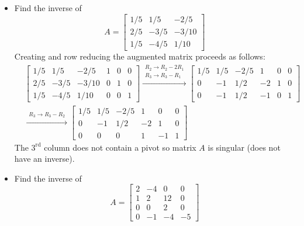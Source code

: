 \documentclass{article}
\begin{document}
\begin{itemize}
\begin{align*}
\begin{array}{ccc|ccc}
0 & 0 & 0 & -2 & 1 & 1  
\end{array}\right]
\end{align*}
The \(3^{\text{rd}}\) column does not contain a pivot so matrix \(A\) is singular (does not have an inverse).
\item Find the inverse of 
\[A = \begin{bmatrix}
1/5 & 1/5 & -2/5 \\
2/5 & -3/5 & -3/10 \\
1/5 & -4/5 & 1/10 
\end{bmatrix}\]
Creating and row reducing the augmented matrix proceeds as follows:
\begin{align*}
& \left[\begin{array}{ccc|ccc}
1/5 & 1/5 & -2/5     & 1 & 0 & 0 \\   
2/5 & -3/5 & -3/10 & 0 & 1 & 0 \\ 
1/5 & -4/5 & 1/10  & 0 & 0 & 1  
\end{array}\right]
\xrightarrow{\begin{array}{c} R_2 \rightarrow R_2 - 2R_1 \\ R_3 \rightarrow R_3 - R_1 \end{array}} 
\left[\begin{array}{ccc|ccc}
1/5 & 1/5 & -2/5 &  1 & 0 & 0 \\   
0    &   -1 & 1/2  & -2 & 1 & 0 \\ 
0    &   -1 & 1/2  & -1 & 0 & 1  
\end{array}\right] \\
& \xrightarrow{\begin{array}{c} R_3 \rightarrow R_3 - R_2 \end{array}} 
\left[\begin{array}{ccc|ccc}
1/5 & 1/5 & -2/5 &  1 &  0 & 0 \\   
0    &   -1 & 1/2  & -2 &  1 & 0 \\ 
0    &    0 & 0      &  1 & -1 & 1  
\end{array}\right]
\end{align*}
The \(3^{\text{rd}}\) column does not contain a pivot so matrix \(A\) is singular (does not have an inverse).
\item Find the inverse of 
\[A = \begin{bmatrix}
2 & -4 & 0 & 0 \\
1 & 2 & 12 & 0 \\
0 & 0 & 2 & 0 \\
0 & -1 & -4 & -5
\end{bmatrix}\]

\end{itemize}
\end{document}

